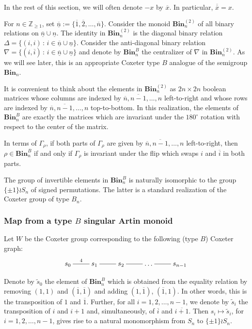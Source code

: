 \documentclass[a4paper]{amsart}
\begin{document}
In the rest of this section,  we will often denote $-x$ by $\overline{x}$.
In particular, $\overline{\overline{x}}=x$.

For $n\in\mathbb{Z}_{\geq 1}$, set  $\underline{\overline{n}}:=\{\overline{1},\overline{2},\dots,\overline{n}\}$. 
Consider the monoid $\mathbf{Bin}^{(2)}_n$ of all binary relations 
on $\underline{\overline{n}}\cup\underline{n}$.
The identity in $\mathbf{Bin}^{(2)}_n$ is the diagonal binary relation 
$\Delta=\{(i,i)\,:\, i\in \underline{\overline{n}}\cup\underline{n}\}$.
Consider the anti-diagonal binary relation
$\nabla=\{(i,\overline{i})\,:\, i\in \underline{\overline{n}}\cup\underline{n}\}$
and denote by $\mathbf{Bin}_n^B$ the centralizer of $\nabla$ in $\mathbf{Bin}^{(2)}_n$.
As we will see later, this is an appropriate Coxeter type $B$ analogue of 
the semigroup $\mathbf{Bin}_n$.

It is convenient to think about the elements in $\mathbf{Bin}^{(2)}_n$
as $2n\times 2n$ boolean matrices whose columns are indexed by
$\overline{n},\overline{n-1},\dots,n$ left-to-right and whose rows are indexed by
$\overline{n},\overline{n-1},\dots,n$ top-to-bottom. In this realization, the elements 
of $\mathbf{Bin}_n^B$ are exactly the matrices which are invariant
under the $180^\circ$ rotation with respect to the center of the matrix.

In terms  of $\Gamma_\rho$, if both parts of $\Gamma_\rho$ are given by
$\overline{n},\overline{n-1},\dots,n$ left-to-right, then $\rho\in\mathbf{Bin}_n^B$ if and only
if $\Gamma_\rho$ is invariant under the flip which swaps $i$ and $\overline{i}$
in both parts.

The group of invertible elements in $\mathbf{Bin}_n^B$ is naturally isomorphic
to the group $\{\pm 1\}\wr S_n$ of signed permutations. The latter is
a standard realization of the Coxeter group of type $B_n$.

\subsubsection{Map from a type $B$ singular Artin monoid}\label{s4.7.4}

Let $W$ be the Coxeter group corresponding to the following (type $B$) Coxeter graph:
\begin{displaymath}
\xymatrix{s_0\ar@{-}[r]^4&s_1\ar@{-}[r]&s_2\ar@{-}[r]&\dots\ar@{-}[r]&s_{n-1}} 
\end{displaymath}


Denote by $\tilde{s}_0$ the element
of $\mathbf{Bin}_n^B$ which is obtained 
from the equality relation by removing $(1,1)$ and $(\overline{1},\overline{1})$
and adding $(1,\overline{1})$, $(\overline{1},1)$. In other words,
this is the transposition of $1$ and $\overline{1}$.
Further, for all $i=1,2,\dots,n-1$, we denote by $\tilde{s}_i$ the 
transposition of $i$ and $i+1$ and, simultaneously, of
$\overline{i}$ and $\overline{i+1}$. Then
$s_i\mapsto \tilde{s}_i$, for $i=1,2,\dots,n-1$, gives rise to a
natural monomorphism from $S_n$ to $\{\pm 1\}\wr S_n$.
\end{document}

